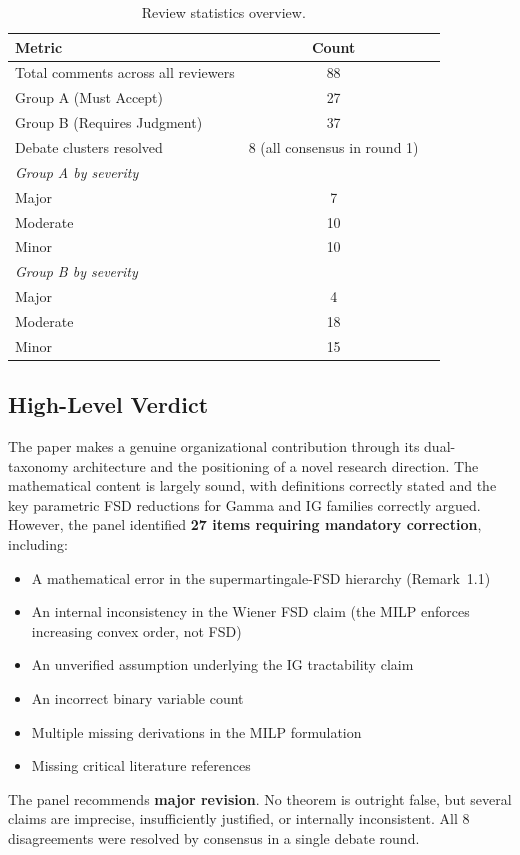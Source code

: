 \documentclass[11pt,a4paper]{article}
\begin{document}
\begin{table}[h]
\centering
\begin{tabular}{lcc}
\toprule
\textbf{Metric} & \textbf{Count} \\
\midrule
Total comments across all reviewers & 88 \\
Group A (Must Accept) & 27 \\
Group B (Requires Judgment) & 37 \\
Debate clusters resolved & 8 (all consensus in round 1) \\
\midrule
\multicolumn{2}{l}{\textit{Group A by severity}} \\
\quad Major & 7 \\
\quad Moderate & 10 \\
\quad Minor & 10 \\
\midrule
\multicolumn{2}{l}{\textit{Group B by severity}} \\
\quad Major & 4 \\
\quad Moderate & 18 \\
\quad Minor & 15 \\
\bottomrule
\end{tabular}
\caption{Review statistics overview.}
\end{table}

\subsection{High-Level Verdict}
The paper makes a genuine organizational contribution through its dual-taxonomy architecture and the positioning of a novel research direction. The mathematical content is largely sound, with definitions correctly stated and the key parametric FSD reductions for Gamma and IG families correctly argued. However, the panel identified \textbf{27 items requiring mandatory correction}, including:
\begin{itemize}[nosep,leftmargin=1.5em]
  \item A mathematical error in the supermartingale-FSD hierarchy (Remark~1.1)
  \item An internal inconsistency in the Wiener FSD claim (the MILP enforces increasing convex order, not FSD)
  \item An unverified assumption underlying the IG tractability claim
  \item An incorrect binary variable count
  \item Multiple missing derivations in the MILP formulation
  \item Missing critical literature references
\end{itemize}
The panel recommends \textbf{major revision}. No theorem is outright false, but several claims are imprecise, insufficiently justified, or internally inconsistent. All 8 disagreements were resolved by consensus in a single debate round.
\end{document}
